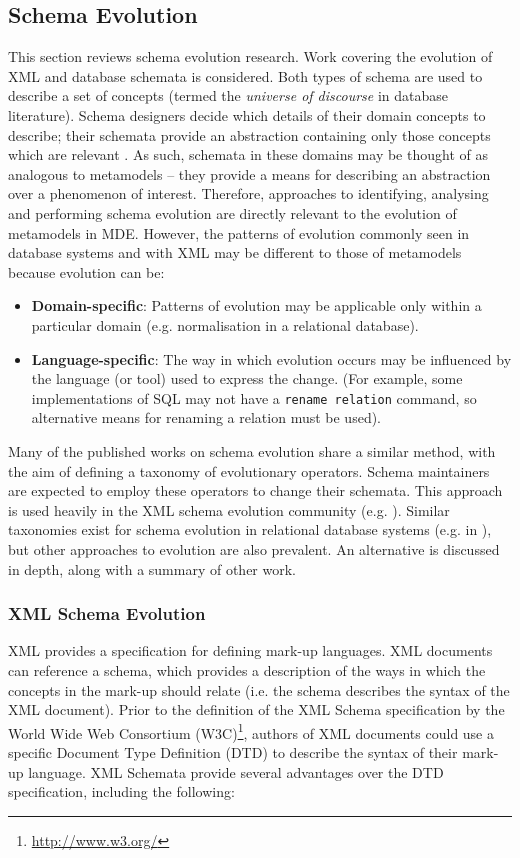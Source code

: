 \subsection{Schema Evolution}
\label{subsec:schema_evolution}
This section reviews schema evolution research. Work covering the evolution of XML and database schemata is considered. Both types of schema are used to describe a set of concepts (termed the \textit{universe of discourse} in database literature). Schema designers decide which details of their domain concepts to describe; their schemata provide an abstraction containing only those concepts which are relevant \cite[pg. 30]{elmasri06database}. As such, schemata in these domains may be thought of as analogous to metamodels -- they provide a means for describing an abstraction over a phenomenon of interest. Therefore, approaches to identifying, analysing and performing schema evolution are directly relevant to the evolution of metamodels in MDE. However, the patterns of evolution commonly seen in database systems and with XML may be different to those of metamodels because evolution can be:

\begin{itemize}
 \item \textbf{Domain-specific}: Patterns of evolution may be applicable only within a particular domain (e.g. normalisation in a relational database).
 \item \textbf{Language-specific}: The way in which evolution occurs may be influenced by the language (or tool) used to express the change. (For example, some implementations of SQL may not have a \texttt{rename relation} command, so alternative means for renaming a relation must be used).
\end{itemize}

Many of the published works on schema evolution share a similar method, with the aim of defining a taxonomy of evolutionary operators. Schema maintainers are expected to employ these operators to change their schemata. This approach is used heavily in the XML schema evolution community (e.g. \cite{guerrini05impact,kramer01xem,su01xem}). Similar taxonomies exist for schema evolution in relational database systems (e.g. in \cite{banerjee87semantics,edelweiss05temporal}), but other approaches to evolution are also prevalent. An alternative is discussed in depth, along with a summary of other work.


\subsubsection{XML Schema Evolution}
\label{LitReview:XmlSchemaEvo}
XML provides a specification for defining mark-up languages. XML documents can reference a schema, which provides a description of the ways in which the concepts in the mark-up should relate (i.e. the schema describes the syntax of the XML document). Prior to the definition of the XML Schema specification \cite{xmlschema} by the World Wide Web Consortium (W3C)\footnote{\url{http://www.w3.org/}}, authors of XML documents could use a specific Document Type Definition (DTD) to describe the syntax of their mark-up language. XML Schemata provide several advantages over the DTD specification, including the following:

